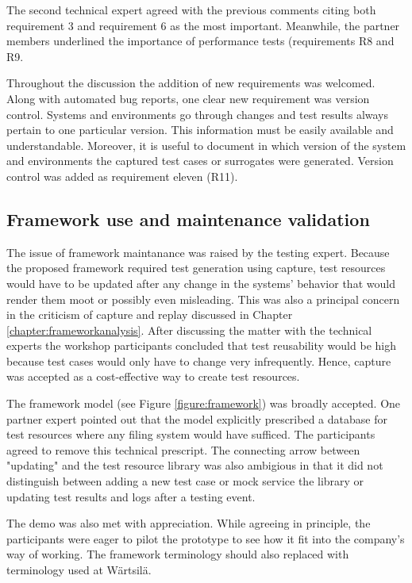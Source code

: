 \documentclass[12pt,a4paper,oneside,pdftex]{report}
\begin{document}
{%
The second technical expert agreed with the previous comments citing both requirement 3 and requirement 6 as the most important. Meanwhile, the partner members underlined the importance of performance tests (requirements R8 and R9.

Throughout the discussion the addition of new requirements was welcomed. Along with automated bug reports, one clear new requirement was version control. Systems and environments go through changes and test results always pertain to one particular version. This information must be easily available and understandable. Moreover, it is useful to document in which version of the system and environments the captured test cases or surrogates were generated. Version control was added as requirement eleven (R11).

\subsection{Framework use and maintenance validation}

The issue of framework maintanance was raised by the testing expert. Because the proposed framework required test generation using capture, test resources would have to be updated after any change in the systems' behavior that would render them moot or possibly even misleading. This was also a principal concern in the criticism of capture and replay discussed in Chapter \ref{chapter:frameworkanalysis}. After discussing the matter with the technical experts the workshop participants concluded that test reusability would be high because test cases would only have to change very infrequently. Hence, capture was accepted as a cost-effective way to create test resources.

The framework model (see Figure \ref{figure:framework}) was broadly accepted. One partner expert pointed out that the model explicitly prescribed a database for test resources where any filing system would have sufficed. The participants agreed to remove this technical prescript. The connecting arrow between "updating" and the test resource library was also ambigious in that it did not distinguish between adding a new test case or mock service the library or updating test results and logs after a testing event.

The demo was also met with appreciation. While agreeing in principle, the participants were eager to pilot the prototype to see how it fit into the company's way of working. The framework terminology should also replaced with terminology used at Wärtsilä.

}
\end{document}
